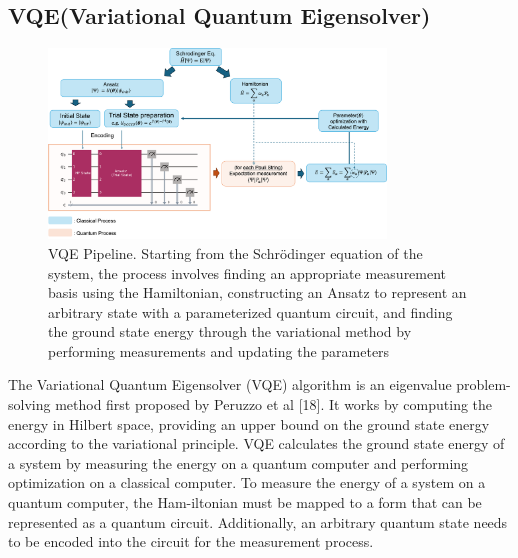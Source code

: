 \documentclass[pdflatex,sn-mathphys-num]{sn-jnl}%
\theoremstyle{thmstyleone}%
\theoremstyle{thmstyletwo}%
\theoremstyle{thmstylethree}%
\begin{document}
\subsection{VQE(Variational Quantum Eigensolver)}\label{subsec2.2}
\begin{figure}[htbp]
\centering
\includegraphics[width=0.8\textwidth]{fig/VQE_pipeline.png}
\caption{VQE Pipeline. Starting from the Schrödinger equation of the system, the process involves finding an appropriate measurement basis using the Hamiltonian, constructing an Ansatz to represent an arbitrary state with a parameterized quantum circuit, and finding the ground state energy through the variational method by performing measurements and updating the parameters}\label{Fig.2}
\end{figure}
The Variational Quantum Eigensolver (VQE) algorithm is an eigenvalue problem-solving method first proposed by Peruzzo et al [18]. 
It works by computing the energy in Hilbert space, providing an upper bound on the ground state energy according to the variational principle. 
VQE calculates the ground state energy of a system by measuring the energy on a quantum computer and performing optimization on a classical computer. 
To measure the energy of a system on a quantum computer, the Ham-iltonian must be mapped to a form that can be represented as a quantum circuit. 
Additionally, an arbitrary quantum state needs to be encoded into the circuit for the measurement process.
\end{document}
